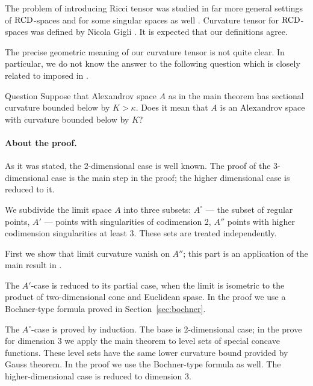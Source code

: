 The problem of introducing Ricci tensor
was studied in far more general settings of 
 $\operatorname{RCD}$-spaces \cite{G1,St,H}
 and
for some singular  spaces as well \cite{L}.
Curvature tensor for  $\operatorname{RCD}$-spaces was defined by Nicola Gigli \cite{G}.
It is expected that our definitions agree.

The precise geometric meaning of our curvature tensor is not quite clear. 
In particular, we do not know the answer to the following question which is closely related to imposed in \cite[Conjecture~1.1]{G}.

\begin{thm}{Question}
Suppose that Alexandrov space $A$ as in the main theorem has sectional curvature bounded below by $K>\kappa$.
Does it mean that $A$ is an Alexandrov space with curvature bounded below by $K$?
\end{thm}

\paragraph{About the proof.}
As it was stated, the 2-dimensional case is well known.
The proof of the 3-dimensional case is the main step in the proof;
the higher dimensional case is reduced to it.

We subdivide the limit space $A$ into
three subsets: $A^\circ$ --- the subset of regular 
points, $A'$ --- points with singularities of codimension 2,
$A''$ points with higher codimension singularities at least 3.
These sets are treated independently.

First we show that limit curvature vanish on $A''$; 
this part is an application of the main result in \cite{petrunin-SC}.

The $A'$-case is reduced to its partial case, when the limit is isometric to the product of two-dimensional cone and Euclidean spase.
In the proof we use a Bochner-type formula proved in Section~\ref{sec:bochner}.

The $A^\circ$-case is proved by induction.
The base is $2$-dimensional case; in the prove for dimension $3$ we apply the main theorem to level sets of special concave functions.
These level sets have the same lower curvature bound provided by Gauss theorem. 
In the proof we use the Bochner-type formula as well.
The higher-dimensional case is reduced to dimension $3$.
